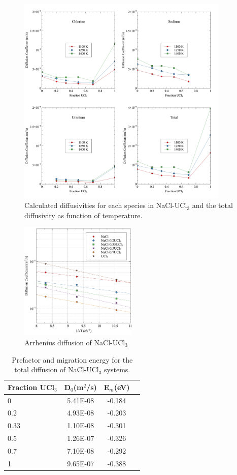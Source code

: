 \documentclass[preprint,3p,10pt,onecolumn,number,sort&compress]{elsarticle}
\begin{document}
{\begin{figure}[htb]
\centering
\includegraphics[width=0.9\textwidth]{diff1.jpg}
\caption{Calculated diffusivities for each species in NaCl-UCl{$_3$} and the total diffusivity as function of temperature.} 
\label{fig:diff}
\end{figure}

\begin{figure}[htb]
\centering
\includegraphics[width=0.5\textwidth]{arrhenius.jpg}
\caption{Arrhenius diffusion of NaCl-UCl{$_3$}} 
\label{fig:arrhenius}
\end{figure}

\begin{table}[hb!]
\centering
\caption{Prefactor and migration energy for the total diffusion of NaCl-UCl$_3$ systems.}
\begin{tabular}{lccc|}
\hline
\hline
Fraction UCl$_3$	&	D$_0$(m$^2$/s)	&	E$_m$(eV)	\\
\hline
0	&	5.41E-08	&	-0.184	\\
0.2	&	4.93E-08	&	-0.203	\\
0.33	&	1.10E-08	&	-0.301	\\
0.5	&	1.26E-07	&	-0.326	\\
0.7	&	7.10E-08	&	-0.292	\\
1	&	9.65E-07	&	-0.388	\\
\hline
\hline
\end{tabular}
\label{table:diff}
\end{table}


}
\end{document}
